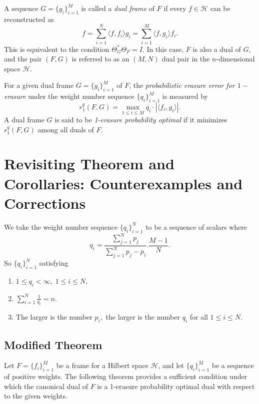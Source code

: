 \documentclass[final,1p,times]{elsarticle}
\begin{document}
A sequence \( G = \{g_i\}_{i=1}^M \) is called a \emph{dual frame} of \( F \) if every \( f \in \mathcal{H} \) can be reconstructed as
\[
f = \sum_{i=1}^N \langle f, f_i \rangle g_i = \sum_{i=1}^M \langle f, g_i \rangle f_i.
\]
This is equivalent to the condition \( \Theta_G^* \Theta_F = I \). In this case, \( F \) is also a dual of \( G \), and the pair \( (F, G) \) is referred to as an \((M, N)\) dual pair in the \( n \)-dimensional space \( \mathcal{H} \).






For a given dual frame $G = \{g_i\}_{i=1}^M$ of $F$, the \emph{probabilistic erasure error for $1-$erasure} under the weight number sequence $\{q_i\}_{i=1}^M$ is measured by
\[
r_1^q(F,G) = \max_{1 \leq i \leq M} q_i \cdot |\langle f_i, g_i \rangle|.
\]
A dual frame $G$ is said to be \textit{1-erasure probability optimal} if it minimizes $r_1^q(F,G)$ among all duals of $F$.


\section{Revisiting Theorem and Corollaries: Counterexamples and Corrections}
We take the weight number sequence $\{q_i\}_{i=1}^N$ to be a sequence of scalars where
\begin{equation}\label{eqn1}
    q_i = \dfrac{\sum\limits_{j=1}^N p_j}{\sum\limits_{j=1}^N p_j - p_i}. \dfrac{M-1}{N}.
\end{equation}
So $\{q_i\}_{i=1}^N$  satisfying

	\begin{enumerate}
	\item [{\em (i)}] $1\leq q_i < \infty,\; 1 \leq i \leq N ,$
	\item [{\em (ii)}] $\sum\limits_{i=1}^N \frac{1}{q_i} =n.$
        \item [{\em (iii)}] The larger is the number $p_i,$ the larger is the number $q_i$ for all $1 \leq i \leq N.$
\end{enumerate}
	
\subsection{Modified Theorem }

\noindent Let $F = \{f_i\}_{i=1}^M$ be a frame for a Hilbert space $\mathcal{H}$, and let $\{q_i\}_{i=1}^M$ be a sequence of positive weights. The following theorem provides a sufficient condition under which the canonical dual of $F$ is a 1-erasure probability optimal dual with respect to the given weights.
    
\end{document}
